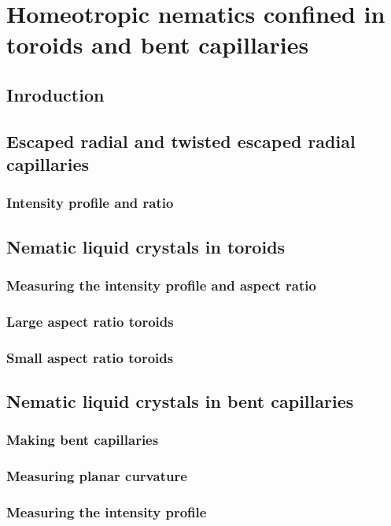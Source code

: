 \chapter{Homeotropic nematics confined in toroids and bent capillaries}

\section{Inroduction}

\section{Escaped radial and twisted escaped radial capillaries}
\subsection{Intensity profile and ratio}


\section{Nematic liquid crystals in toroids}
\subsection{Measuring the intensity profile and aspect ratio}
\subsection{Large aspect ratio toroids}
\subsection{Small aspect ratio toroids}

\section{Nematic liquid crystals in bent capillaries}
\subsection{Making bent capillaries}
\subsection{Measuring planar curvature}
\subsection{Measuring the intensity profile}

